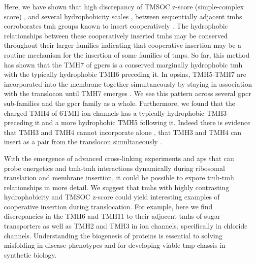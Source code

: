 Here, we have shown that high discrepancy of TMSOC  z\--score (simple-complex score) \cite{Wong2011, Wong2012}, and several hydrophobicity scales \cite{Hessa2005, Kyte1982, White1999, Eisenberg1984}, between sequentially adjacent \gls{tmh}s corroborates \gls{tmh} groups known to insert cooperatively \cite{Ismail2008, Sato2003, Zhang2007, Cymer2015}.
The hydrophobic relationships between these cooperatively inserted \gls{tmh}s may be conserved throughout their larger families indicating that cooperative insertion may be a routine mechanism for the insertion of some families of \gls{tmp}s.
So far, this method has shown that the TMH7 of \gls{gpcr}s is a conserved marginally hydrophobic \gls{tmh} with the typically hydrophobic TMH6 preceding it.
In opsins, TMH5\--TMH7 are incorporated into the membrane together simultaneously by staying in association with the translocon until TMH7 emerges \cite{Ismail2008}.
We see this pattern across several \gls{gpcr} sub\--families and the \gls{gpcr} family as a whole.
Furthermore, we found that the charged TMH4 of 6TMH ion channels has a typically hydrophobic TMH3 preceding it and a more hydrophobic TMH5 following it.
Indeed there is evidence that TMH3 and TMH4 cannot incorporate alone \cite{Sato2003}, that TMH3 and TMH4 can insert as a pair from the translocon simultaneously \cite{Zhang2007, Cymer2015}.

With the emergence of advanced cross\--linking experiments and \gls{ap}s that can probe energetics and \gls{tmh}\--\gls{tmh} interactions dynamically during ribosomal translation and membrane insertion, it could be possible to expore \gls{tmh}\--\gls{tmh} relationships in more detail.
We suggest that \gls{tmh}s with highly contrasting hydrophobicity and TMSOC z\--score could yield interesting examples of cooperative insertion during translocation.
For example, here we find discrepancies in the TMH6 and TMH11 to their adjacent \gls{tmh}s of sugar transporters as well as TMH2 and TMH3 in ion channels, specifically in chloride channels.
Understanding the biogenesis of proteins is essential to solving misfolding in disease phenotypes and for developing viable \gls{tmp} chassis in synthetic biology.
